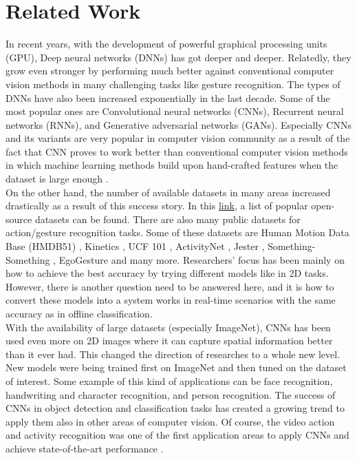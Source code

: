 \chapter{Related Work}
\label{ch:relatedwork}

In recent years, with the development of powerful graphical processing units  (GPU), Deep neural networks (DNNs) has got deeper and deeper.  Relatedly, they grow even stronger by performing much better against conventional computer vision methods in many challenging tasks like gesture recognition.  The types of DNNs have also been increased exponentially  in the last decade.  Some of the most popular ones are Convolutional neural networks (CNNs), Recurrent neural networks (RNNs), and Generative adversarial networks (GANs).  Especially CNNs and its variants are very popular in computer vision community as a result of the fact that  CNN proves to work better than conventional computer vision methods in which machine learning methods build upon hand-crafted features when the dataset is large enough  \cite{krizhevsky2012imagenet}.\\

On the other hand, the number of available datasets in many areas increased drastically as a result of this success story.   In this \href{https://en.wikipedia.org/wiki/List_of_datasets_for_machine_learning_research}{link},  a list of popular open-source datasets can be found.   There are also many public datasets for action/gesture recognition tasks.   Some of these  datasets  are  Human  Motion  Data  Base (HMDB51)  \cite{kuehne_hmdb51:_2011}, Kinetics \cite{kay_kinetics_2017}, UCF 101 \cite{soomro_ucf101:_2012}, ActivityNet  \cite{heilbron_activitynet:_2015}, Jester  \cite{twentybn_20bn-jester_nodate}, Something- Something \cite{goyal_something_2017}, EgoGesture \cite{zhang_egogesture:_2018} and many more. Researchers’ focus has been mainly on how to achieve the best accuracy by trying different models like in 2D tasks.  However, there is another question need to be answered here, and it is how to convert these models into a system works in real-time scenarios with the same accuracy as in offline classification.\\

With the availability of large datasets  (especially ImageNet),  CNNs has been used even more on 2D images where it can capture spatial information better than it ever had.  This changed the direction of researches to a whole new level.  New models were being trained first on ImageNet and then tuned on the dataset of interest.  Some example of this kind of applications can be face recognition, handwriting and character recognition,  and person recognition. The success of CNNs in object detection and classification tasks \cite{krizhevsky2012imagenet, zhou2014learning, Girshick2014rich} has created a growing trend to apply them also in other areas of computer vision.  Of course, the video action and activity recognition was one of the first application areas to apply  CNNs and achieve state-of-the-art performance \cite{simonyan2014two, Feichtenhofer2016convolutional, Feichtenhofer2016spatiotemporal}.\\

